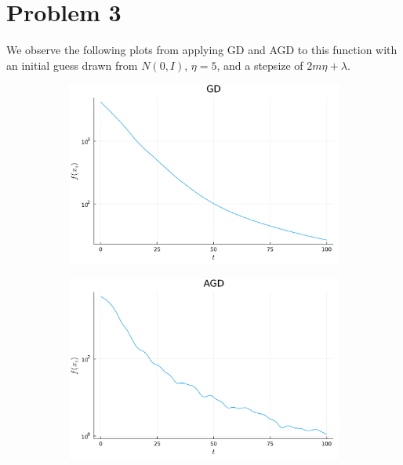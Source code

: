 \documentclass{article}
\begin{document}
\section{Problem 3}
We observe the following plots from applying GD and AGD to this function with an initial guess drawn from $N(0,I)$, $\eta=5$, and a stepsize of $2m\eta+\lambda$.
\begin{figure}[H]
	\centering
	\begin{subfigure}{0.495\linewidth}
		\centering
		\includegraphics[width=\linewidth]{prob3a.pdf}
	\end{subfigure}
	\begin{subfigure}{0.495\linewidth}
		\centering
		\includegraphics[width=\linewidth]{prob3b.pdf}
	\end{subfigure}
\end{figure}
\end{document}

